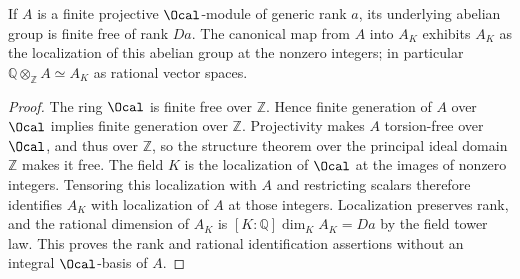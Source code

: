 \begin{lemma}
\label{lem:integral-restriction-rank}
\leanok
If $A$ is a finite projective $\Ocal$-module of generic rank $a$, its
underlying abelian group is finite free of rank $Da$. The canonical map
from $A$ into $A_K$ exhibits $A_K$ as the localization of this abelian
group at the nonzero integers; in particular
$\mathbb Q\otimes_{\mathbb Z}A\simeq A_K$ as rational vector spaces.
\end{lemma}
\begin{proof}
The ring $\Ocal$ is finite free over $\mathbb Z$. Hence finite generation
of $A$ over $\Ocal$ implies finite generation over $\mathbb Z$.
Projectivity makes $A$ torsion-free over $\Ocal$, and thus over
$\mathbb Z$, so the structure theorem over the principal ideal domain
$\mathbb Z$ makes it free. The field $K$ is the localization of
$\Ocal$ at the images of nonzero integers. Tensoring this localization
with $A$ and restricting scalars therefore identifies $A_K$ with
localization of $A$ at those integers. Localization preserves rank,
and the rational dimension of $A_K$ is
$[K:\mathbb Q]\dim_K A_K=Da$ by the field tower law. This proves the
rank and rational identification assertions without an integral
$\Ocal$-basis of $A$.
\end{proof}

